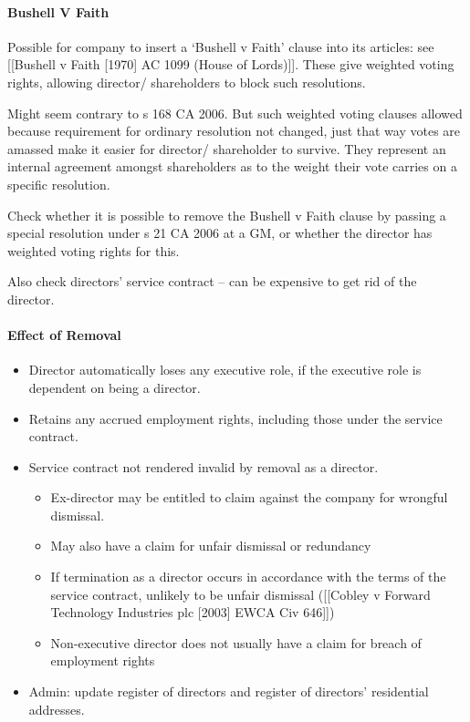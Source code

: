 \documentclass[
]{article}
\newenvironment{Shaded}{}{}
\newcommand{\NormalTok}[1]{#1}
\providecommand{\tightlist}{%
  \setlength{\itemsep}{0pt}\setlength{\parskip}{0pt}}
\begin{document}
\hypertarget{bushell-v-faith}{%
\paragraph{Bushell V Faith}\label{bushell-v-faith}}

Possible for company to insert a `Bushell v Faith' clause into its
articles: see {[}{[}Bushell v Faith {[}1970{]} AC 1099 (House of
Lords){]}{]}. These give weighted voting rights, allowing director/
shareholders to block such resolutions.

Might seem contrary to s 168 CA 2006. But such weighted voting clauses
allowed because requirement for ordinary resolution not changed, just
that way votes are amassed make it easier for director/ shareholder to
survive. They represent an internal agreement amongst shareholders as to
the weight their vote carries on a specific resolution.

\begin{Shaded}
\begin{Highlighting}[]
\NormalTok{Check whether it is possible to remove the Bushell v Faith clause by passing a special resolution under s 21 CA 2006 at a GM, or whether the director has weighted voting rights for this. }
\end{Highlighting}
\end{Shaded}

Also check directors' service contract -- can be expensive to get rid of
the director.

\hypertarget{effect-of-removal}{%
\paragraph{Effect of Removal}\label{effect-of-removal}}

\begin{itemize}
\tightlist
\item
  Director automatically loses any executive role, if the executive role
  is dependent on being a director.
\item
  Retains any accrued employment rights, including those under the
  service contract.
\item
  Service contract not rendered invalid by removal as a director.

  \begin{itemize}
  \tightlist
  \item
    Ex-director may be entitled to claim against the company for
    wrongful dismissal.
  \item
    May also have a claim for unfair dismissal or redundancy
  \item
    If termination as a director occurs in accordance with the terms of
    the service contract, unlikely to be unfair dismissal ({[}{[}Cobley
    v Forward Technology Industries plc {[}2003{]} EWCA Civ 646{]}{]})
  \item
    Non-executive director does not usually have a claim for breach of
    employment rights
  \end{itemize}
\item
  Admin: update register of directors and register of directors'
  residential addresses.
\end{itemize}
\end{document}
